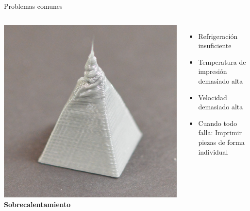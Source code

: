 \documentclass{beamer}
\begin{document}
	\begin{frame}{Problemas comunes}
		\begin{columns}
				\includegraphics[width=\textwidth]{images/Over-Heating}
				\textbf{Sobrecalentamiento}
				\begin{itemize}
					\item Refrigeración insuficiente
					\item Temperatura de impresión demasiado alta
					\item Velocidad demasiado alta
					\item Cuando todo falla: Imprimir piezas de forma individual
				\end{itemize}
		\end{columns}
	\end{frame}
\end{document}
